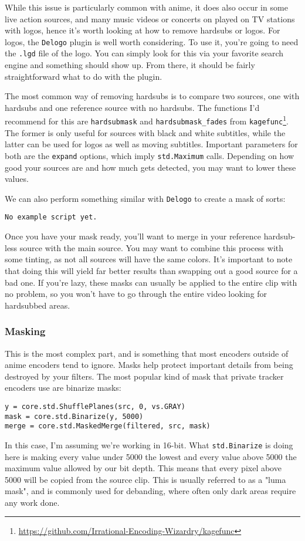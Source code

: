 \documentclass{scrartcl}
\begin{document}
While this issue is particularly common with anime, it does also occur in some live action sources, and many music videos or concerts on played on TV stations with logos, hence it's worth looking at how to remove hardsubs or logos.  For logos, the \texttt{Delogo} plugin is well worth considering.  To use it, you're going to need the \texttt{.lgd} file of the logo.  You can simply look for this via your favorite search engine and something should show up.  From there, it should be fairly straightforward what to do with the plugin.

The most common way of removing hardsubs is to compare two sources, one with hardsubs and one reference source with no hardsubs.  The functions I'd recommend for this are \texttt{hardsubmask} and \texttt{hardsubmask\_fades} from \texttt{kagefunc}\footnote{\url{https://github.com/Irrational-Encoding-Wizardry/kagefunc}}.  The former is only useful for sources with black and white subtitles, while the latter can be used for logos as well as moving subtitles.  Important parameters for both are the \texttt{expand} options, which imply \texttt{std.Maximum} calls.  Depending on how good your sources are and how much gets detected, you may want to lower these values.

We can also perform something similar with \texttt{Delogo} to create a mask of sorts:

\begin{lstlisting}
No example script yet.
\end{lstlisting}

Once you have your mask ready, you'll want to merge in your reference hardsub-less source with the main source.  You may want to combine this process with some tinting, as not all sources will have the same colors.  It's important to note that doing this will yield far better results than swapping out a good source for a bad one.  If you're lazy, these masks can usually be applied to the entire clip with no problem, so you won't have to go through the entire video looking for hardsubbed areas.

\pagebreak
\subsubsection{Masking}\label{masking}

This is the most complex part, and is something that most encoders outside of anime encoders tend to ignore. Masks help protect important details from being destroyed by your filters. The most popular kind of mask that private tracker encoders use are binarize masks:
\begin{lstlisting}
y = core.std.ShufflePlanes(src, 0, vs.GRAY)
mask = core.std.Binarize(y, 5000)
merge = core.std.MaskedMerge(filtered, src, mask)
\end{lstlisting}
In this case, I'm assuming we're working in 16-bit. What \texttt{std.Binarize} is doing here is making every value under 5000 the lowest and every value above 5000 the maximum value allowed by our bit depth. This means that every pixel above 5000 will be copied from the source clip.  This is usually referred to as a "luma mask", and is commonly used for debanding, where often only dark areas require any work done.
\end{document}
